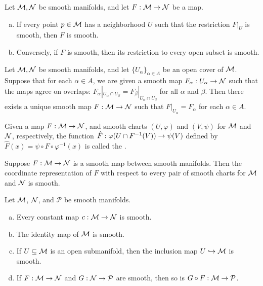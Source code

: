 \documentclass[11pt,a4paper]{article}
\begin{document}
\begin{proposition}
Let $\mathcal{M},\mathcal{N}$ be smooth manifolds, and let $F:\mathcal{M}\rightarrow \mathcal{N}$ be a map.
\begin{enumerate}[(a)]
    \item If every point $p\in\mathcal{M}$ has a neighborhood $U$ such that the restriction $F|_U$ is smooth, then $F$ is smooth.
    \item Conversely, if $F$ is smooth, then its restriction to every open subset is smooth.
\end{enumerate}
\end{proposition}

\begin{proposition}
Let $\mathcal{M},\mathcal{N}$ be smooth manifolds, and let $\{U_\alpha\}_{\alpha\in A}$ be an open cover of $\mathcal{M}$. Suppose that for each $\alpha\in A$, we are given a smooth map $F_\alpha:U_\alpha\rightarrow \mathcal{N}$ such that the maps agree on overlaps: $F_\alpha|_{U_\alpha\cap U_\beta} = F_\beta|_{U_\alpha\cap U_\beta}$ for all $\alpha$ and $\beta$. Then there exists a unique smooth map $F:\mathcal{M}\rightarrow \mathcal{N}$ such that $F|_{U_\alpha} = F_\alpha$ for each $\alpha\in A$.
\end{proposition}

\begin{definition}
Given a map $F:\mathcal{M}\rightarrow \mathcal{N}$, and smooth charts $(U,\varphi)$ and $(V,\psi)$ for $\mathcal{M}$ and $\mathcal{N}$, respectively, the function $\hat{F}:\varphi(U\cap F^{-1}(V))\rightarrow \psi(V)$ defined by $\hat{F}(x) = \psi\circ F\circ\varphi^{-1}(x)$ is called the .
\end{definition}

\begin{proposition}
Suppose $F:\mathcal{M}\rightarrow \mathcal{N}$ is a smooth map between smooth manifolds. Then the coordinate representation of $F$ with respect to every pair of smooth charts for $\mathcal{M}$ and $\mathcal{N}$ is smooth.
\end{proposition}

\begin{proposition}
Let $\mathcal{M}$, $\mathcal{N}$, and $\mathcal{P}$ be smooth manifolds.
\begin{enumerate}[(a)]
    \item Every constant map $c:\mathcal{M}\rightarrow \mathcal{N}$ is smooth.
    \item The identity map of $\mathcal{M}$ is smooth.
    \item If $U \subseteq \mathcal{M}$ is an open submanifold, then the inclusion map $U\hookrightarrow \mathcal{M}$ is smooth.
    \item If $F:\mathcal{M}\rightarrow \mathcal{N}$ and $G:\mathcal{N}\rightarrow \mathcal{P}$ are smooth, then so is $G\circ F:\mathcal{M}\rightarrow \mathcal{P}$.
\end{enumerate}
\end{proposition}
\end{document}
